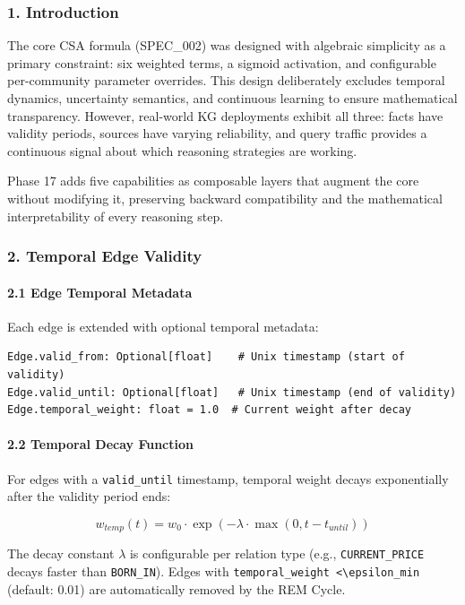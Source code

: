 \documentclass[10pt,journal,compsoc]{IEEEtran}
\begin{document}
\subsubsection{1. Introd\-uction}
The core CSA formula (SPEC\_002) was designed with algebraic simplicity as a primary constraint: six weighted terms, a sigmoid activation, and confi\-gurable per-community parameter overrides. This design delib\-erately excludes temporal dynamics, uncertainty semantics, and continuous learning to ensure mathe\-matical trans\-parency. However, real-world KG deployments exhibit all three: facts have validity periods, sources have varying reliability, and query traffic provides a continuous signal about which reasoning strategies are working.

Phase 17 adds five capab\-ilities as composable layers that augment the core without modifying it, preserving backward compa\-tibility and the mathe\-matical inter\-pretability of every reasoning step.

\subsubsection{2. Temporal Edge Validity}

\paragraph{2.1 Edge Temporal Metadata}
Each edge is extended with optional temporal metadata:
\begin{lstlisting}
Edge.valid_from: Optional[float]    # Unix timestamp (start of validity)
Edge.valid_until: Optional[float]   # Unix timestamp (end of validity)
Edge.temporal_weight: float = 1.0  # Current weight after decay
\end{lstlisting}

\paragraph{2.2 Temporal Decay Function}
For edges with a \texttt{valid\_until} timestamp, temporal weight decays expon\-entially after the validity period ends:

\begin{equation}
w_{temp}(t) = w_0 \cdot \exp\left(-\lambda \cdot \max(0, t - t_{until})\right)
\end{equation}

The decay constant $\lambda$ is confi\-gurable per relation type (e.g., \texttt{CURRENT\_PRICE} decays faster than \texttt{BORN\_IN}). Edges with \texttt{temporal\_weight \textless  \textbackslash epsilon\_{min}} (default: 0.01) are autom\-atically removed by the REM Cycle.
\end{document}

